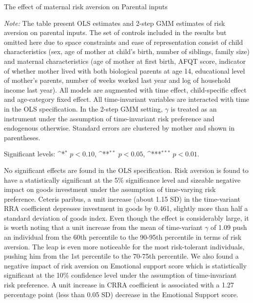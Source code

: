 \documentclass[emulatestandardclasses, 10pt, abstract = true]{scrartcl}
\begin{document}
\begin{table}[!t]
	\centering
	\begin{threeparttable}
		\def\sym#1{\ifmmode^{#1}\else\(^{#1}\)\fi}
		\caption{The effect of maternal risk aversion on Parental inputs}	
		\setlength{\extrarowheight}{0.3em}
		
		\label{table:main-result}
		\begin{tablenotes}[flushleft] \footnotesize
			\item \textit{Note:} The table present OLS estimates and 2-step GMM estimates of risk aversion on parental inputs. The set of controls included in the results but omitted here due to space constraints and ease of representation consist of child characteristics (sex, age of mother at child's birth, number of siblings, family size) and maternal characteristics (age of mother at first birth, AFQT score, indicator of whether mother lived with both biological parents at age 14, educational level of mother's parents, number of weeks worked last year and log of household income last year). All models are augmented with time effect, child-specific effect and age-category fixed effect. All time-invariant variables are interacted with time in the OLS specification. In the 2-step GMM setting, $\gamma$ is treated as an instrument under the assumption of time-invariant risk preference and endogenous otherwise. Standard errors are clustered by mother and shown in parentheses. 
			\item Significant levels: \sym{*} \(p<0.10\), \sym{**} \(p<0.05\), \sym{***} \(p<0.01\).
		\end{tablenotes}
	\end{threeparttable}
\end{table}

No significant effects are found in the OLS specification. Risk aversion is found to have a statistically significant at the 5\% significance level and sizeable negative impact on goods investment under the assumption of time-varying risk preference. Ceteris paribus, a unit increase (about 1.15 SD) in the time-variant RRA coefficient depresses investment in goods by 0.461, slightly more than half a standard deviation of goods index. Even though the effect is considerably large, it is worth noting that a unit increase from the mean of time-variant $\gamma$ of 1.09 push an individual from the 60th percentile to the 90-95th percentile in terms of risk aversion. The leap is even more noticeable for the most risk-tolerant individuals, pushing him from the 1st percentile to the 70-75th percentile. We also found a negative impact of risk aversion on Emotional support score which is statistically significant at the 10\% confidence level under the assumption of time-invariant risk preference. A unit increase in CRRA coefficient is associated with a 1.27 percentage point (less than 0.05 SD) decrease in the Emotional Support score. 
\end{document}
